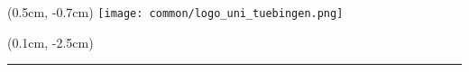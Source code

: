 {
\beamertemplatenavigationsymbolsempty %
\begin{frame}[plain] %
    \begin{textblock*}{0cm}(0.5cm, -0.7cm)
        \texttt{[image: common/logo\_uni\_tuebingen.png]}
    \end{textblock*}
    \titlepage
    \begin{textblock*}{0cm}(0.1cm, -2.5cm)
        \textcolor{university_tuebingen}{\rule{11.8cm}{0.2cm}}
    \end{textblock*}
\end{frame}
}
